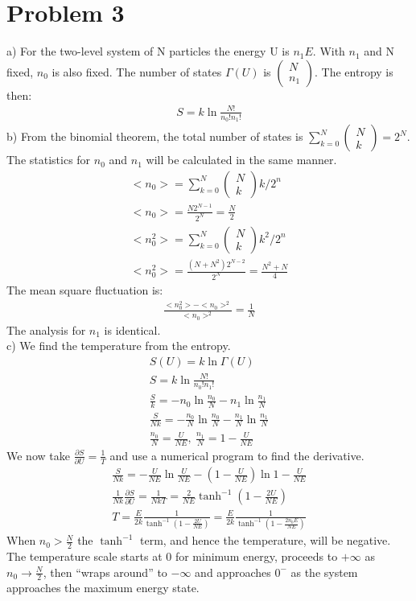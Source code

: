 \documentclass[a4paper,11pt]{article}
\numberwithin{equation}{section}
\begin{document}
\section{Problem 3}
a) For the two-level system of N particles the energy U is $n_1E$. 
With $n_1$ and N fixed, $n_0$ is also fixed.
The number of states $\Gamma(U)$ is $\left(\substack{N\\n_1}\right)$.
The entropy is then:
\begin{gather}
 S=k\ln{\frac{N!}{n_0!n_1!}}
\end{gather}
b) From the binomial theorem, the total number of states is $\sum_{k=0}^N \left(\substack{N\\k}\right)=2^N$.
The statistics for $n_0$ and $n_1$ will be calculated in the same manner.
\begin{gather}
 <n_0>=\sum_{k=0}^N \left(\substack{N\\k}\right)k / 2^n\\
 <n_0>=\frac{N2^{N-1}}{2^N}=\frac{N}{2}\\
 <n_0^2>=\sum_{k=0}^N \left(\substack{N\\k}\right)k^2 / 2^n\\
 <n_0^2>=\frac{(N+N^2)2^{N-2}}{2^N}=\frac{N^2+N}{4}
\end{gather}
The mean square fluctuation is:
\begin{gather}
 \frac{<n_0^2>-<n_0>^2}{<n_0>^2}=\frac{1}{N}
\end{gather}
The analysis for $n_1$ is identical.
\\
c) We find the temperature from the entropy.
\begin{gather}
 S(U)=k\ln{\Gamma(U)}\\
 S=k\ln{\frac{N!}{n_0!n_1!}}\\
 \frac{S}{k}=-n_0\ln{\frac{n_0}{N}}-n_1\ln{\frac{n_1}{N}}\\
 \frac{S}{Nk}=-\frac{n_0}{N}\ln{\frac{n_0}{N}}-\frac{n_1}{N}\ln{\frac{n_1}{N}}\\
 \frac{n_0}{N}=\frac{U}{NE},\ \frac{n_1}{N}=1-\frac{U}{NE}
\end{gather}
We now take $\frac{\partial S}{\partial U}=\frac{1}{T}$ and use a numerical program to find the derivative.
\begin{gather}
 \frac{S}{Nk}=-\frac{U}{NE}\ln{\frac{U}{NE}}-(1-\frac{U}{NE})\ln{1-\frac{U}{NE}}\\
 \frac{1}{Nk}\frac{\partial S}{\partial U}=\frac{1}{NkT}=\frac{2}{NE}\tanh^{-1}{(1-\frac{2U}{NE})}\\
 T=\frac{E}{2k}\frac{1}{\tanh^{-1}{(1-\frac{2U}{NE})}}=\frac{E}{2k}\frac{1}{\tanh^{-1}{(1-\frac{2n_0E}{NE})}}
\end{gather}
When $n_0>\frac{N}{2}$ the $\tanh^{-1}$ term, and hence the temperature, will be negative. 
The temperature scale starts at 0 for minimum energy, proceeds to $+\infty$ as $n_0 \rightarrow \frac{N}{2}$,
then ``wraps around'' to $-\infty$ and approaches $0^-$ as the system approaches the maximum energy state.
\end{document}
